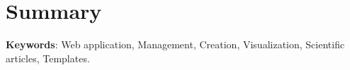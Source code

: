 \documentclass[12pt]{article}
\renewcommand{\listalgorithmname}{Lista de algoritmos}
\begin{document}

\clearpage
\section*{\centering Summary}


\textbf{Keywords}: Web application, Management, Creation, Visualization, Scientific articles, Templates.

\clearpage
{}
\renewcommand\contentsname{Índice}
\tableofcontents



\clearpage
{}
\setcounter{page}{1}

\clearpage


\clearpage


\clearpage


\clearpage


\clearpage


\clearpage
\renewcommand\listfigurename{Índice de figuras}

\listoffigures

\clearpage
{}
\renewcommand\listtablename{Índice de cuadros}
\listoftables

\clearpage
{}
\renewcommand\listalgorithmname{Índice de algoritmos}
\listofalgorithms{}



\clearpage

{} 
\printbibliography{}
 
\end{document}
